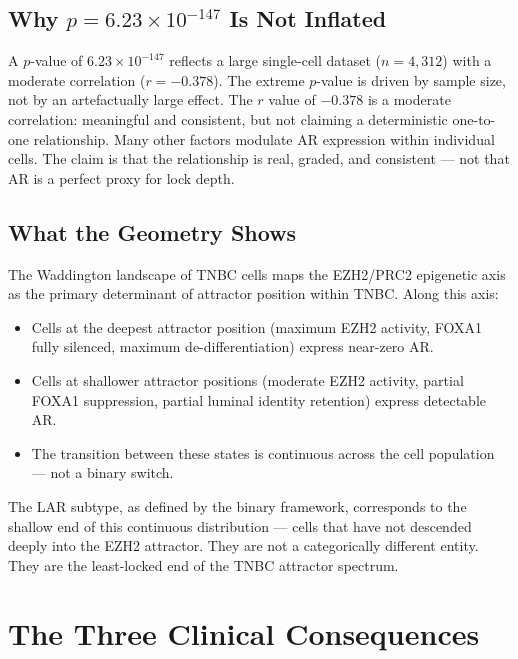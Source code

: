 \documentclass[12pt, a4paper]{article}
\begin{document}
\subsection{\texorpdfstring{Why $p = 6.23 \times 10^{-147}$
Is Not Inflated}{Why the p-value Is Not Inflated}}

A $p$-value of $6.23 \times 10^{-147}$ reflects
a large single-cell dataset ($n = 4{,}312$) with
a moderate correlation ($r = -0.378$). The
extreme $p$-value is driven by sample size, not
by an artefactually large effect. The $r$ value
of $-0.378$ is a moderate correlation: meaningful
and consistent, but not claiming a deterministic
one-to-one relationship. Many other factors
modulate AR expression within individual cells.
The claim is that the relationship is real,
graded, and consistent --- not that AR is a
perfect proxy for lock depth.

\subsection{What the Geometry Shows}

The Waddington landscape of TNBC cells maps the
EZH2/PRC2 epigenetic axis as the primary
determinant of attractor position within TNBC.
Along this axis:

\begin{itemize}
    \item Cells at the deepest attractor position
    (maximum EZH2 activity, FOXA1 fully silenced,
    maximum de-differentiation) express near-zero
    AR.

    \item Cells at shallower attractor positions
    (moderate EZH2 activity, partial FOXA1
    suppression, partial luminal identity
    retention) express detectable AR.

    \item The transition between these states
    is continuous across the cell population ---
    not a binary switch.
\end{itemize}

The LAR subtype, as defined by the binary
framework, corresponds to the shallow end of
this continuous distribution --- cells that
have not descended deeply into the EZH2
attractor. They are not a categorically
different entity. They are the least-locked
end of the TNBC attractor spectrum.

\section{The Three Clinical Consequences}
\end{document}
